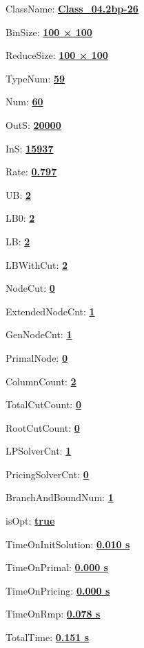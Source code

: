 \documentclass[11pt]{article}
\begin{document}
\pagestyle{empty}


ClassName: \underline{\textbf{Class_04.2bp-26}}
\par
BinSize: \underline{\textbf{100 × 100}}
\par
ReduceSize: \underline{\textbf{100 × 100}}
\par
TypeNum: \underline{\textbf{59}}
\par
Num: \underline{\textbf{60}}
\par
OutS: \underline{\textbf{20000}}
\par
InS: \underline{\textbf{15937}}
\par
Rate: \underline{\textbf{0.797}}
\par
UB: \underline{\textbf{2}}
\par
LB0: \underline{\textbf{2}}
\par
LB: \underline{\textbf{2}}
\par
LBWithCut: \underline{\textbf{2}}
\par
NodeCut: \underline{\textbf{0}}
\par
ExtendedNodeCnt: \underline{\textbf{1}}
\par
GenNodeCnt: \underline{\textbf{1}}
\par
PrimalNode: \underline{\textbf{0}}
\par
ColumnCount: \underline{\textbf{2}}
\par
TotalCutCount: \underline{\textbf{0}}
\par
RootCutCount: \underline{\textbf{0}}
\par
LPSolverCnt: \underline{\textbf{1}}
\par
PricingSolverCnt: \underline{\textbf{0}}
\par
BranchAndBoundNum: \underline{\textbf{1}}
\par
isOpt: \underline{\textbf{true}}
\par
TimeOnInitSolution: \underline{\textbf{0.010 s}}
\par
TimeOnPrimal: \underline{\textbf{0.000 s}}
\par
TimeOnPricing: \underline{\textbf{0.000 s}}
\par
TimeOnRmp: \underline{\textbf{0.078 s}}
\par
TotalTime: \underline{\textbf{0.151 s}}
\par
\newpage
\end{document}
